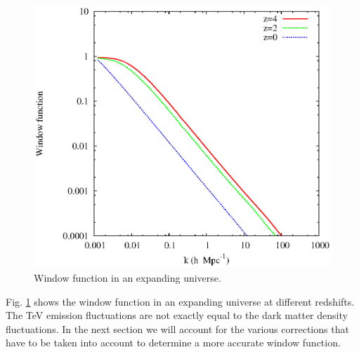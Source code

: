 \documentclass[twocolumns]{emulateapj}
\begin{document}
\begin{figure}[h]
  \centering
  \includegraphics[width = .45\textwidth ]{window_nobiases}
  \caption{Window function in an expanding universe.}
  \label{fig:window_nobiases}
\end{figure}

Fig. \ref{fig:window_nobiases} shows the window function in an expanding universe at different redshifts.  %
The TeV emission fluctuations are not exactly equal to the dark matter density fluctuations. In the next section we will account for the various corrections that have to be taken into account to determine a more accurate window function.
\end{document}

